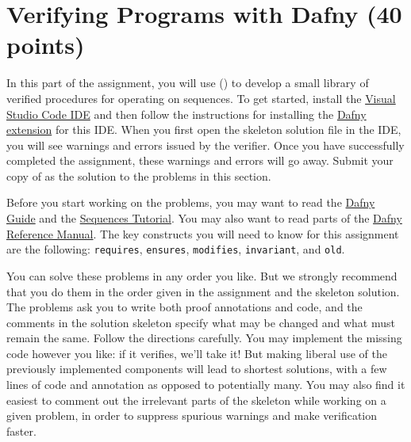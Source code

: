 \documentclass{handout}
\begin{document}
\section{Verifying Programs with Dafny (40 points)}

In this part of the assignment, you will use \dafny () to develop a
small library of verified procedures for operating on sequences. To get started,
install the \href{https://code.visualstudio.com}{Visual Studio Code IDE} and
then follow the instructions for installing the
\href{https://github.com/Microsoft/dafny/wiki/INSTALL}{Dafny
extension} for this IDE. When you first open the skeleton solution file
 in the IDE, you will see warnings and errors issued by
the verifier. Once you have successfully completed the assignment, these
warnings and errors will go away. Submit your copy of  as
the solution to the problems in this section. 

Before you start working on the problems, you may want to read  the
\href{http://rise4fun.com/Dafny/tutorial/guide}{Dafny Guide} and the
\href{https://rise4fun.com/Dafny/tutorialcontent/Sequences}{Sequences Tutorial}.
You may also want to read parts of the
\href{http://www.divms.uiowa.edu/~tinelli/classes/181/Papers/dafny-reference.pdf}{Dafny
Reference Manual}.  The key constructs you will need to know for this assignment
are the following: \lstinline{requires}, \lstinline{ensures},
\lstinline{modifies}, \lstinline{invariant}, and \lstinline{old}. 

You can solve these problems in any order you like.  But we strongly recommend
that you do them in the order given in the assignment and the skeleton solution.
The problems ask you to write both proof annotations and code, and the comments
in the solution skeleton specify what may be changed and what must remain the
same.  Follow the directions carefully. You may implement the missing code
however you like: if it verifies, we'll take it!  But making liberal use of the
previously implemented components will lead to shortest solutions, with a few
lines of code and annotation as opposed to potentially many. You may also find
it easiest to comment out the irrelevant parts of the skeleton while working on
a given problem, in order to suppress spurious warnings and make verification
faster.
\end{document}
